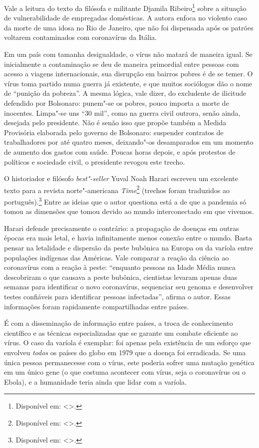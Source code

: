 Vale a leitura do
texto da filósofa e militante Djamila Ribeiro\footnote{Disponível em: \textless{}{}\textgreater{}.} sobre a situação de
vulnerabilidade de empregadas domésticas. A autora enfoca no violento
caso da morte de uma idosa no Rio de Janeiro, que não foi dispensada
após os patrões voltarem contaminados com coronavírus da Itália.

Em um país com tamanha desigualdade, o vírus não matará de maneira
igual. Se inicialmente a contaminação se deu de maneira primordial entre
pessoas com acesso a viagens internacionais, sua disrupção em bairros
pobres é de se temer. O vírus toma partido numa guerra já existente, e
que muitos sociólogos dão o nome de ``punição da pobreza''. A mesma
lógica, vale dizer, do excludente de ilicitude defendido por Bolsonaro:
punem"-se os pobres, pouco importa a morte de inocentes. Limpa"-se uns
``30 mil'', como na guerra civil outrora, senão ainda, desejada pelo
presidente. Não é senão isso que propõe também a Medida Provisória
elaborada pelo governo de Bolsonaro: suspender contratos de
trabalhadores por até quatro meses, deixando"-os desamparados em um
momento de aumento dos gastos com saúde. Poucas horas depois, e após
protestos de políticos e sociedade civil, o presidente revogou este
trecho.

O historiador e filósofo \emph{best"-seller} Yuval Noah Harari escreveu
um excelente texto para a revista norte"-americana
\emph{Time}\footnote{Disponível em: \textless{}{}\textgreater{}.} (trechos foram traduzidos ao português).\footnote{Disponível em: \textless{}{}\textgreater{}.} Entre as ideias que o autor questiona está a de que a pandemia só tomou as dimensões que tomou devido ao mundo
interconectado em que vivemos.

Harari defende precisamente o contrário: a propagação de doenças em
outras épocas era mais letal, e havia infinitamente menos conexão entre
o mundo. Basta pensar na letalidade e dispersão da peste bubônica na
Europa ou da varíola entre populações indígenas das Américas. Vale
comparar a reação da ciência ao coronavírus com a reação à peste:
``enquanto pessoas na Idade Média nunca descobriram o que causava a
peste bubônica, cientistas levaram apenas duas semanas para identificar
o novo coronavírus, sequenciar seu genoma e desenvolver testes
confiáveis para identificar pessoas infectadas'', afirma o autor. Essas
informações foram rapidamente compartilhadas entre países.

É com a disseminação de informação entre países, a troca de conhecimento
científico e as técnicas especializadas que se garante um combate
eficiente ao vírus. O caso da varíola é exemplar: foi apenas pela
existência de um esforço que envolveu \emph{todos} os países do globo
em 1979 que a doença foi erradicada. Se uma única pessoa permanecesse com o
vírus, este poderia sofrer uma mutação genética em um único gene (o que
costuma acontecer com vírus, seja o coronavírus ou o Ebola), e a humanidade
teria ainda que lidar com a varíola.

